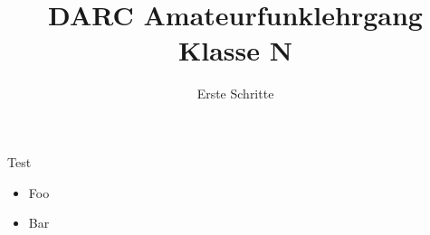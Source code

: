 \documentclass[aspectratio = 169]{beamer}
\begin{document}

\title{DARC Amateurfunklehrgang Klasse N}
\author{Erste Schritte}
\begin{frame}
\maketitle
\end{frame}

\begin{frame}{Test}
    \begin{itemize}
        \item Foo
        \item Bar
    \end{itemize}
\end{frame}
\end{document}

